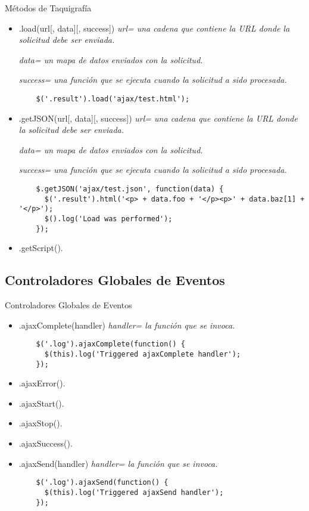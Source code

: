 \begin{frame}[fragile]{Métodos de Taquigrafía} %
\begin{itemize}
    \item .load(url[, data][, success]) \textit{ url= una cadena que contiene la URL donde la solicitud debe ser enviada.}

    \textit{ data= un mapa de datos enviados con la solicitud.}

    \textit{ success= una función que se ejecuta cuando la solicitud a sido procesada.}
    \begin{lstlisting}
    $('.result').load('ajax/test.html');
    \end{lstlisting}
    \item .getJSON(url[, data][, success]) \textit{ url= una cadena que contiene la URL donde la solicitud debe ser enviada.}

    \textit{ data= un mapa de datos enviados con la solicitud.}

    \textit{ success= una función que se ejecuta cuando la solicitud a sido procesada.}
    \begin{lstlisting}
    $.getJSON('ajax/test.json', function(data) {
      $('.result').html('<p> + data.foo + '</p><p>' + data.baz[1] + '</p>');
      $().log('Load was performed');
    });  
    \end{lstlisting}
    \item .getScript().
\end{itemize}
\end{frame}

\subsection{Controladores Globales de Eventos} %

\begin{frame}[fragile]{Controladores Globales de Eventos} %
\begin{itemize}
    \item .ajaxComplete(handler) \textit{ handler= la función que se invoca.}
    \begin{lstlisting}
    $('.log').ajaxComplete(function() {
      $(this).log('Triggered ajaxComplete handler');
    });
    \end{lstlisting}
    \item .ajaxError().
    \item .ajaxStart().
    \item .ajaxStop().
    \item .ajaxSuccess().
    \item .ajaxSend(handler) \textit{ handler= la función que se invoca.} 
    \begin{lstlisting}
    $('.log').ajaxSend(function() {
      $(this).log('Triggered ajaxSend handler');
    });
    \end{lstlisting}
\end{itemize}
\end{frame}

